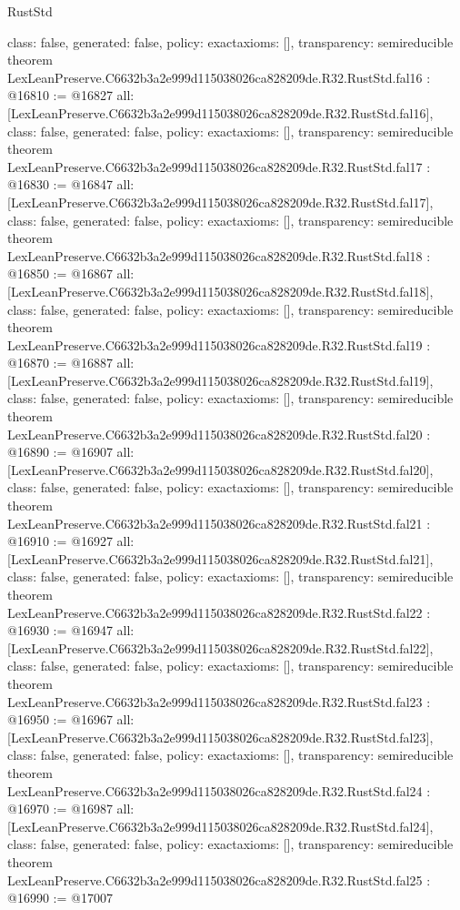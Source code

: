 \begin{lexlean}{RustStd}
\begin{coremodule}
{  class: false,
  generated: false,
  policy: exact{axioms: []},
  transparency: semireducible
}
theorem LexLeanPreserve.C6632b3a2e999d115038026ca828209de.R32.RustStd.fal16 : @16810 := @16827 {
  all: [LexLeanPreserve.C6632b3a2e999d115038026ca828209de.R32.RustStd.fal16],
  class: false,
  generated: false,
  policy: exact{axioms: []},
  transparency: semireducible
}
theorem LexLeanPreserve.C6632b3a2e999d115038026ca828209de.R32.RustStd.fal17 : @16830 := @16847 {
  all: [LexLeanPreserve.C6632b3a2e999d115038026ca828209de.R32.RustStd.fal17],
  class: false,
  generated: false,
  policy: exact{axioms: []},
  transparency: semireducible
}
theorem LexLeanPreserve.C6632b3a2e999d115038026ca828209de.R32.RustStd.fal18 : @16850 := @16867 {
  all: [LexLeanPreserve.C6632b3a2e999d115038026ca828209de.R32.RustStd.fal18],
  class: false,
  generated: false,
  policy: exact{axioms: []},
  transparency: semireducible
}
theorem LexLeanPreserve.C6632b3a2e999d115038026ca828209de.R32.RustStd.fal19 : @16870 := @16887 {
  all: [LexLeanPreserve.C6632b3a2e999d115038026ca828209de.R32.RustStd.fal19],
  class: false,
  generated: false,
  policy: exact{axioms: []},
  transparency: semireducible
}
theorem LexLeanPreserve.C6632b3a2e999d115038026ca828209de.R32.RustStd.fal20 : @16890 := @16907 {
  all: [LexLeanPreserve.C6632b3a2e999d115038026ca828209de.R32.RustStd.fal20],
  class: false,
  generated: false,
  policy: exact{axioms: []},
  transparency: semireducible
}
theorem LexLeanPreserve.C6632b3a2e999d115038026ca828209de.R32.RustStd.fal21 : @16910 := @16927 {
  all: [LexLeanPreserve.C6632b3a2e999d115038026ca828209de.R32.RustStd.fal21],
  class: false,
  generated: false,
  policy: exact{axioms: []},
  transparency: semireducible
}
theorem LexLeanPreserve.C6632b3a2e999d115038026ca828209de.R32.RustStd.fal22 : @16930 := @16947 {
  all: [LexLeanPreserve.C6632b3a2e999d115038026ca828209de.R32.RustStd.fal22],
  class: false,
  generated: false,
  policy: exact{axioms: []},
  transparency: semireducible
}
theorem LexLeanPreserve.C6632b3a2e999d115038026ca828209de.R32.RustStd.fal23 : @16950 := @16967 {
  all: [LexLeanPreserve.C6632b3a2e999d115038026ca828209de.R32.RustStd.fal23],
  class: false,
  generated: false,
  policy: exact{axioms: []},
  transparency: semireducible
}
theorem LexLeanPreserve.C6632b3a2e999d115038026ca828209de.R32.RustStd.fal24 : @16970 := @16987 {
  all: [LexLeanPreserve.C6632b3a2e999d115038026ca828209de.R32.RustStd.fal24],
  class: false,
  generated: false,
  policy: exact{axioms: []},
  transparency: semireducible
}
theorem LexLeanPreserve.C6632b3a2e999d115038026ca828209de.R32.RustStd.fal25 : @16990 := @17007 {
}
\end{coremodule}
\end{lexlean}
